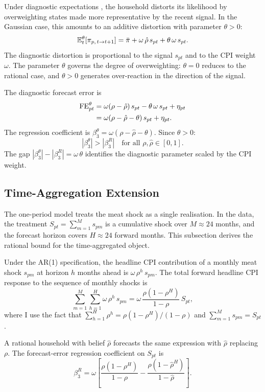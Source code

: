 Under diagnostic expectations \citep{Bordalo2018}, the
household distorts its likelihood by overweighting states made
more representative by the recent signal.
In the Gaussian case, this amounts to an additive distortion
with parameter $\theta > 0$:
\[
  \mathbb{E}_t^\theta[\pi_{p,\,t \to t+1}]
  = \bar{\pi} + \omega\,\hat{\rho}\,s_{pt}
    + \theta\,\omega\,s_{pt}.
\]
The diagnostic distortion is proportional to the signal $s_{pt}$
and to the CPI weight $\omega$.
The parameter $\theta$ governs the degree of overweighting:
$\theta = 0$ reduces to the rational case, and $\theta > 0$
generates over-reaction in the direction of the signal.

The diagnostic forecast error is
\begin{align}
  \mathrm{FE}^\theta_{pt}
  &= \omega(\rho - \hat{\rho})\,s_{pt}
    - \theta\,\omega\,s_{pt} + \eta_{pt} \notag \\
  &= \omega(\rho - \hat{\rho} - \theta)\,s_{pt}
    + \eta_{pt}.
    \label{eq:app_diagnostic_fe}
\end{align}
The regression coefficient is
$\beta_3^\theta = \omega(\rho - \hat{\rho} - \theta)$.
Since $\theta > 0$:
\[
  |\beta_3^\theta| > |\beta_3^R|
  \quad \text{for all } \rho, \hat{\rho} \in [0,1].
\]
The gap $|\beta_3^\theta| - |\beta_3^R| = \omega\,\theta$
identifies the diagnostic parameter scaled by the CPI weight.

\subsection{Time-Aggregation Extension}

The one-period model treats the meat shock as a single
realisation.
In the data, the treatment $S_{pt} = \sum_{m=1}^{M} s_{pm}$
is a cumulative shock over $M \approx 24$ months, and the
forecast horizon covers $H \approx 24$ forward months.
This subsection derives the rational bound for the
time-aggregated object.

Under the AR(1) specification, the headline CPI contribution
of a monthly meat shock $s_{pm}$ at horizon $h$ months ahead
is $\omega\,\rho^h\,s_{pm}$.
The total forward headline CPI response to the sequence of
monthly shocks is
\[
  \sum_{m=1}^{M}\sum_{h=1}^{H}
  \omega\,\rho^h\,s_{pm}
  = \omega\,\frac{\rho(1-\rho^H)}{1-\rho}\,S_{pt},
\]
where I use the fact that
$\sum_{h=1}^H \rho^h = \rho(1-\rho^H)/(1-\rho)$ and
$\sum_{m=1}^M s_{pm} = S_{pt}$.

A rational household with belief $\hat{\rho}$ forecasts the
same expression with $\hat{\rho}$ replacing $\rho$.
The forecast-error regression coefficient on $S_{pt}$ is
\[
  \beta_3^R
  = \omega\left[
      \frac{\rho(1-\rho^H)}{1-\rho}
    - \frac{\hat{\rho}(1-\hat{\rho}^H)}{1-\hat{\rho}}
    \right].
\]

